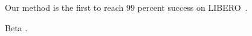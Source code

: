 \documentclass{article}
\newif\ifdraft
\newcommand{\libero}{LIBERO~\cite{ka}}
\begin{document}
\ifdraft Old draft text on Alpha \cite{ka}. \fi

Our method is the first to reach 99 percent success on \libero.

Beta \cite{kb}.


\end{document}
